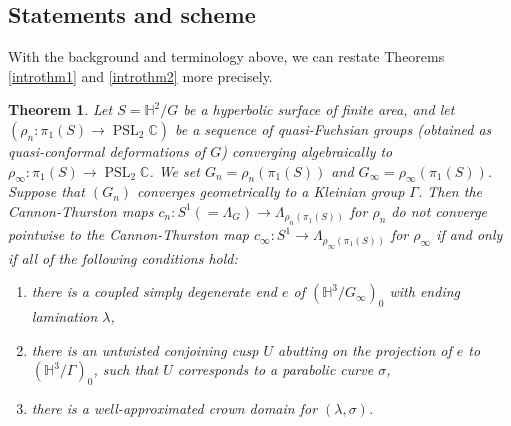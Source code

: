 \documentclass{amsart}
\newtheorem{theorem}{Theorem}[section]
\newtheorem{lemma}[theorem]{Lemma}
\theoremstyle{definition}
\newcommand{\complexes}{\mathbb{C}}
\newcommand{\pslc}{\operatorname{PSL}_2\complexes}
\newcommand\HHH{{\mathbb H}}
\begin{document}
%
%



\subsection{Statements and scheme} With the background and terminology above, we can restate Theorems \ref{introthm1}
and \ref{introthm2} more precisely.

\begin{theorem}
\label{pointwise convergence}
Let $S=\HHH^2/G$ be a hyperbolic surface of finite area, and let $(\rho_n: \pi_1(S) \rightarrow \pslc)$ be a sequence of quasi-Fuchsian groups (obtained as quasi-conformal deformations of $G$) converging algebraically to $\rho_\infty: \pi_1(S) \rightarrow \pslc$.
We set $G_n=\rho_n(\pi_1(S))$ and $G_\infty=\rho_\infty(\pi_1(S))$.
Suppose that $(G_n)$ converges geometrically to a Kleinian group $\Gamma$.
Then the Cannon-Thurston maps $c_n : S^1 (=\Lambda_G) \rightarrow \Lambda_{\rho_n(\pi_1(S))}$ for  $\rho_n$ do not converge pointwise to 
the Cannon-Thurston map  $c_\infty : S^1 \rightarrow \Lambda_{\rho_\infty(\pi_1(S))}$ for $\rho_\infty$ if and only if all of the following conditions hold:
\begin{enumerate}
\item there is a coupled
simply degenerate end $e$ of $(\HHH^3/G_\infty)_0$ with ending lamination $\lambda$,
\item there is an untwisted conjoining cusp $U$ abutting on the projection of $e$ to $(\HHH^3/\Gamma)_0$, such that $U$ corresponds to a parabolic curve $\sigma$,
\item there is a  well-approximated crown domain for $(\lambda, \sigma)$.
\end{enumerate}
\end{theorem}
\end{document}
